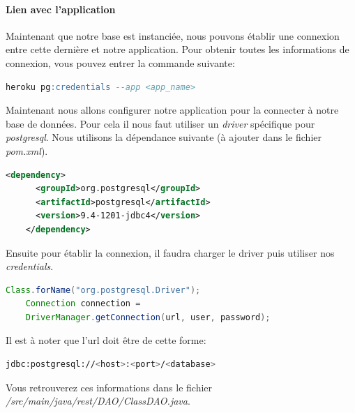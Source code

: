 \documentclass{article}
\begin{document}
	\paragraph{Lien avec l'application}
	  Maintenant que notre base est instanciée, nous pouvons établir une connexion entre cette dernière et notre application.
	  Pour obtenir toutes les informations de connexion, vous pouvez entrer la commande suivante:
	  \begin{lstlisting}[language=sql]
    heroku pg:credentials --app <app_name>
	  \end{lstlisting}
	  Maintenant nous allons configurer notre application pour la connecter à notre base de données. Pour cela il nous faut utiliser un \emph{driver} spécifique pour \emph{postgresql}. 
	  Nous utilisons la dépendance suivante (à ajouter dans le fichier \emph{pom.xml}).
	  \begin{lstlisting}[language=xml]
    <dependency>
      <groupId>org.postgresql</groupId>
      <artifactId>postgresql</artifactId>
      <version>9.4-1201-jdbc4</version>
    </dependency>
	  \end{lstlisting}
	  Ensuite pour établir la connexion, il faudra charger le driver puis utiliser nos \emph{credentials}.
	  \begin{lstlisting}[language=java]
    Class.forName("org.postgresql.Driver");
    Connection connection =  
	DriverManager.getConnection(url, user, password);
	  \end{lstlisting}
	  Il est à noter que l'url doit être de cette forme:
	  \begin{lstlisting}[language=bash]
    jdbc:postgresql://<host>:<port>/<database>
	  \end{lstlisting}
	  Vous retrouverez ces informations dans le fichier \emph{/src/main/java/rest/DAO/ClassDAO.java}.
\end{document}
